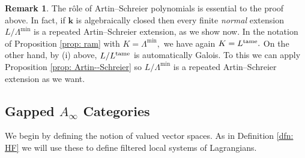 \documentclass{article}
\theoremstyle{plain}%
\theoremstyle{definition}
\newtheorem{rem}[thm]{Remark}
\numberwithin{equation}{section}
\numberwithin{figure}{section}
\def\l{\label}
\def\La{\Lambda}
\def\iy{\infty}
\def\k{{\mathbf{k}}}\def\b{{\mathbf{b}}}\def\x{{\mathbf{x}}}
\begin{document}
\begin{rem}
The r\^ole of Artin--Schreier polynomials is essential to the proof above.
In fact, if $\k$ is algebraically closed then every finite {\it normal} extension $L/\La^{\min}$ is a repeated Artin--Schreier extension, as we show now.
In the notation of Proposition \ref{prop: ram} with $K=\La^{\min},$ we have again $K=L^{\rm tame}.$
On the other hand, by (i) above, $L/L^{\rm tame}$ is automatically Galois.
To this we can apply Proposition \ref{prop: Artin--Schreier} so $L/\La^{\min}$ is a repeated Artin--Schreier extension as we want.
\end{rem}

\subsection{Gapped $A_\iy$ Categories}\l{sec: gap}
We begin by defining the notion of valued vector spaces. As in Definition \ref{dfn: HF} we will use these to define filtered local systems of Lagrangians. 
\end{document}
